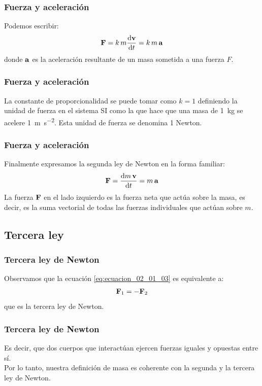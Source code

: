 \documentclass[12pt]{beamer}
\begin{document}
\begin{frame}
\frametitle{Fuerza y aceleración}
Podemos escribir:
\begin{align}
  \vb{F} = k \, m \dv{\vb{v}}{t} = k \, m \, \vb{a}
  \label{eq:ecuacion_02_01_05}
\end{align}
donde $\vb{a}$ es la aceleración resultante de un masa sometida a una fuerza $F$.
\end{frame}
\begin{frame}
\frametitle{Fuerza y aceleración}
La constante de proporcionalidad se puede tomar como $k = 1$ definiendo la unidad de fuerza en el sistema SI como la que hace que una masa de \SI{1}{\kilo\gram} se acelere \SI{1}{\meter\per\square\second}. \pause Esta unidad de fuerza se denomina 1 Newton.
\end{frame}
\begin{frame}
\frametitle{Fuerza y aceleración}
Finalmente expresamos la segunda ley de Newton en la forma familiar:
\begin{align}
\vb{F} = \dv{m \, \vb{v}}{t} =  m \, \vb{a}
\label{eq:ecuacion_02_01_06}
\end{align}
\pause
La fuerza $\vb{F}$ en el lado izquierdo es la fuerza neta que actúa sobre la masa, \pause es decir, es la suma vectorial de todas las fuerzas individuales que actúan sobre $m$.
\end{frame}

\subsection{Tercera ley}

\begin{frame}
\frametitle{Tercera ley de Newton}
Observamos que la ecuación \ref{eq:ecuacion_02_01_03} es equivalente a:
\pause
\begin{align}
  \vb{F}_{1} = - \vb{F}_{2}
  \label{eq:ecuacion_02_01_07}
\end{align}
que es la tercera ley de Newton.
\end{frame}
\begin{frame}
\frametitle{Tercera ley de Newton}
Es decir, que dos cuerpos que interactúan ejercen fuerzas iguales y opuestas entre sí.
\\
\bigskip
\pause
Por lo tanto, nuestra definición de masa es coherente con la segunda y la tercera ley de Newton.
\end{frame}
\end{document}
